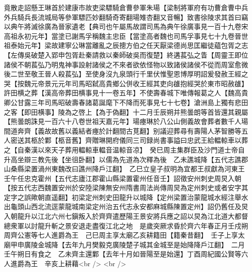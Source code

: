 竟散走詔懸王琳首於建康市故吏梁驃騎倉曹參軍朱瑒【梁制將軍府有功曹倉曹中兵外兵騎兵長流城局等參軍驃匹妙翻騎奇寄翻瑒雉杏翻又音暢】致書徐陵求其首曰竊以典午將滅徐廣為晉家遺老【典司也午屬馬故謂司馬為典午徐廣事見一百十九卷宋高祖永初元年】當塗已謝馬孚稱魏主忠臣【當塗高者魏也司馬孚事見七十九卷晉世祖泰始元年】梁故建寧公琳當離亂之辰摠方伯之任天厭梁德尚思匡繼徒藴包胥之志【左傳吳破楚入郢申包胥赴秦請救以秦師破吳而復楚】終遘萇弘之眚【周靈王即位諸侯不朝萇弘乃明鬼神事設射諸侯之不來者欲依怪物以致諸侯諸侯不從而周室愈微後二世至敬王晉人殺萇弘】至使身沒九泉頭行千里伏惟聖恩博厚明詔爰發赦王經之哭【按魏元帝景元元年司馬昭弑高貴鄉公併收王經其吏向䧺抱經哭於東市昭赦䧺】許田横之葬【漢高帝葬田横事見十一卷五年】不使壽春城下唯傳報葛之人【魏高貴卿公甘露三年司馬昭破壽春諸葛誕麾下不降而死事見七十七卷】滄洲島上獨有悲田之客【即田横事】陵為之啓上【為于偽翻】十二月壬辰朔并熊曇朗等首皆還其親屬【熊曇朗誅見一百六十八卷世祖天嘉元年】瑒瘞琳於八公山側義故會葬者數千人瑒間道奔齊【義故故舊以義結者瘞於計翻間古莧翻】别議迎葬尋有壽陽人茅智勝等五人密送其柩於鄴【柩音舊】齊贈琳開府儀同三司録尚書事謚曰忠武王給輼輬車以葬之【自秦漢以來天子葬用輼輬車輼音温輬音凉】　癸巳周主集群臣及沙門道士帝自升高坐辯三教先後【坐徂卧翻】以儒為先道為次釋為後　乙未譙城降【五代志譙郡山桑縣梁置渦州東魏改曰譙州降戶江翻】　乙巳立皇子叔明為宜都王叔獻為河東王　壬午任忠克霍州【五代志廬江郡霍山縣梁置霍州任音壬】詔徵安州刺史周炅入朝【按五代志西魏置安州於安陸梁陳無安州隋書周法尚傳周炅為定州刺史或者安字其定字之誤歟朝直遥翻】初梁定州刺史田龍升以城降【定州梁置治蒙龍城水經注舉水出龜頭山西北流逕蒙龍城南梁定州治五代志永安都麻城縣陳置定州】詔仍舊任及炅入朝龍升以江北六州七鎭叛入於齊齊遣歷陽王景安將兵應之詔以炅為江北道大都督總衆軍以討龍升斬之景安退走盡復江北之地　是歲突厥求昏於齊六年春正月壬戍朔周齊公憲等七人進爵為王　己巳周主享太廟乙亥耕籍田【籍秦昔翻】　壬子上享太廟甲申廣陵金城降【去年九月樊毅克廣陵楚子城其金城至是始降降戶江翻】　二月壬午朔日有食之　乙未齊主還鄴【去年十月如晉陽至是始還】丁酉周紀國公賢等六人進爵為王　辛亥上耕藉<br />
<br />
